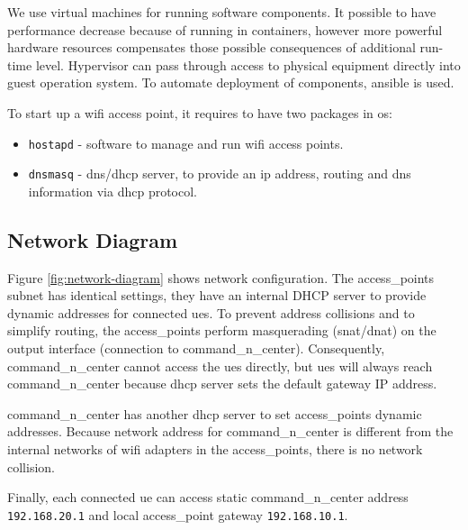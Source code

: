 We use virtual machines for running software components. It possible to 
have performance decrease because of running in containers, however more powerful
hardware resources compensates those possible consequences of additional 
run-time level. Hypervisor can pass through access to physical equipment directly into guest operation system. To automate deployment of components, \gls{ansible} is used.

To start up a \gls{wifi} access point, it requires to have two packages in \acrshort{os}:

\begin{itemize}
\tightlist
\item
  \texttt{hostapd} - software to manage and run \gls{wifi} access points.
\item
  \texttt{dnsmasq} - \acrshort{dns}/\acrshort{dhcp} server, to provide an \acrshort{ip} address, routing
  and \acrshort{dns} information via \acrshort{dhcp} protocol.
\end{itemize}

\subsection{Network Diagram}\label{network-diagram}


Figure \ref{fig:network-diagram} shows network configuration. The \glspl{access_point} subnet has identical settings, they have an internal DHCP server to provide dynamic addresses for connected \glspl{ue}. To prevent address collisions and to simplify routing, the \glspl{access_point} perform masquerading (\acrshort{snat}/\acrshort{dnat}) on the output interface (connection to \gls{command_n_center}). Consequently, \gls{command_n_center} cannot access the \glspl{ue} directly, but \glspl{ue} will always reach \gls{command_n_center} because \acrshort{dhcp} server sets the default gateway IP address.

\gls{command_n_center} has another \acrshort{dhcp} server to set \glspl{access_point} dynamic addresses. Because network address for \gls{command_n_center} is different from the internal networks of \gls{wifi} adapters in the \glspl{access_point}, there is no network collision.

Finally, each connected \gls{ue} can access static \gls{command_n_center} address \texttt{192.168.20.1}
and local \gls{access_point} gateway \texttt{192.168.10.1}.


